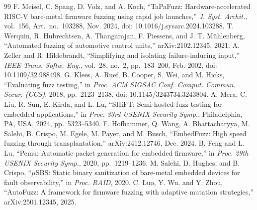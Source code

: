 \documentclass[10pt,letterpaper]{article}
\begin{document}
\begin{thebibliography}{99}
 F. Meisel, C. Spang, D. Volz, and A. Koch, ``TaPaFuzz: Hardware-accelerated RISC-V bare-metal firmware fuzzing using rapid job launches,'' \emph{J. Syst. Archit.}, vol.~156, Art.~no.~103288, Nov. 2024, doi: 10.1016/j.sysarc.2024.103288.
 T. Werquin, R. Hubrechtsen, A. Thangarajan, F. Piessens, and J. T. Mühlenberg, ``Automated fuzzing of automotive control units,'' arXiv:2102.12345, 2021.
 A. Zeller and R. Hildebrandt, ``Simplifying and isolating failure-inducing input,'' \emph{IEEE Trans. Softw. Eng.}, vol.~28, no.~2, pp.~183--200, Feb. 2002, doi: 10.1109/32.988498.
 G. Klees, A. Ruef, B. Cooper, S. Wei, and M. Hicks, ``Evaluating fuzz testing,'' in \emph{Proc. ACM SIGSAC Conf. Comput. Commun. Secur. (CCS)}, 2018, pp.~2123--2138, doi: 10.1145/3243734.3243804.
 A. Mera, C. Liu, R. Sun, E. Kirda, and L. Lu, ``SHiFT: Semi-hosted fuzz testing for embedded applications,'' in \emph{Proc. 33rd USENIX Security Symp.}, Philadelphia, PA, USA, 2024, pp.~5323--5340.
 F. Hofhammer, Q. Wang, A. Bhattacharyya, M. Salehi, B. Crispo, M. Egele, M. Payer, and M. Busch, ``EmbedFuzz: High speed fuzzing through transplantation,'' arXiv:2412.12746, Dec. 2024.
 B. Feng and L. Lu, ``Pemu: Automatic packet generation for embedded firmware,'' in \emph{Proc. 29th USENIX Security Symp.}, 2020, pp.~1219--1236.
 M. Salehi, D. Hughes, and B. Crispo, ``$\mu$SBS: Static binary sanitization of bare-metal embedded devices for fault observability,'' in \emph{Proc. RAID}, 2020.
 C. Luo, Y. Wu, and Y. Zhou, ``AutoFuzz: A framework for firmware fuzzing with adaptive mutation strategies,'' arXiv:2501.12345, 2025.
\end{thebibliography}
\end{document}
